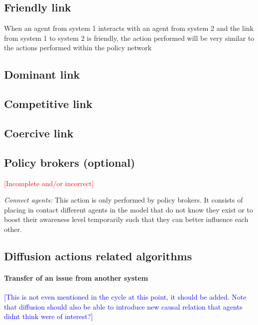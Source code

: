 \subsection{Friendly link}


When an agent from system 1 interacts with an agent from system 2 and the link from system 1 to system 2 is friendly, the action performed will be very similar to the actions performed within the policy network




\subsection{Dominant link}


\subsection{Competitive link}




\subsection{Coercive link}




\subsection{Policy brokers (optional)}


\textcolor{red}{[Incomplete and/or incorrect]}


\emph{Connect agents:} This action is only performed by policy brokers. It consists of placing in contact different agents in the model that do not know they exist or to boost their awareness level temporarily such that they can better influence each other.






\subsection{Diffusion actions related algorithms}


\paragraph{Transfer of an issue from another system}


\textcolor{blue}{[This is not even mentioned in the cycle at this point, it should be added. Note that diffusion should also be able to introduce new causal relation that agents didnt think were of interest?]}


